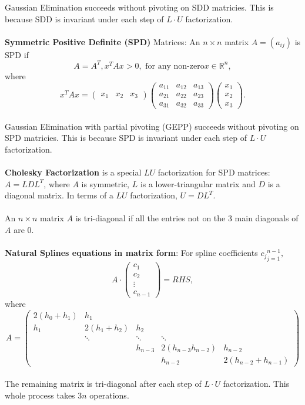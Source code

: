\documentclass{article}
\begin{document}
Gaussian Elimination succeeds without pivoting on SDD matricies. This is because SDD is invariant under each step of $L \cdot U$ factorization. \\ \\
\textbf{Symmetric Positive Definite (SPD)} Matrices: An $n \times n$ matrix $A = (a_{ij})$ is SPD if $$A = A^T, x^T Ax > 0, \text{ for any non-zero} x \in \mathbb{R}^n,$$ where $$x^T Ax = \begin{pmatrix}
    x_1 & x_2 & x_3
\end{pmatrix} \begin{pmatrix}
    a_{11} & a_{12} & a_{13} \\
    a_{21} & a_{22} & a_{23} \\
    a_{31} & a_{32} & a_{33}
\end{pmatrix} \begin{pmatrix}
    x_1 \\
    x_2 \\
    x_3
\end{pmatrix}.$$ \\
Gaussian Elimination with partial pivoting (GEPP) succeeds without pivoting on SPD matricies. This is because SPD is invariant under each step of $L \cdot U$ factorization. \\ \\
\textbf{Cholesky Factorization} is a special $LU$ factorization for SPD matrices: $A = LDL^T$, where $A$ is symmetric, $L$ is a lower-triangular matrix and $D$ is a diagonal matrix. In terms of a $LU$ factorization, $U = DL^T$. \\ \\
An $n \times n$ matrix $A$ is tri-diagonal if all the entries not on the 3 main diagonals of $A$ are 0. \\ \\
\textbf{Natural Splines equations in matrix form}: For spline coefficients ${c_j}_{j = 1}^{n - 1},$ $$A \cdot \begin{pmatrix}
    c_1 \\
    c_2 \\ 
    \vdots \\
    c_{n - 1}
\end{pmatrix} = RHS,$$ where $$A = \begin{pmatrix}
    2(h_0 + h_1) & h_1 \\
    h_1 & 2(h_1 + h_2) & h_2 \\
    & \ddots & \ddots & \ddots \\
    & & h_{n - 3} & 2(h_{n - 3} h_{n - 2}) & h_{n - 2} \\
    & & & h_{n - 2} & 2(h_{n - 2} + h_{n - 1})
\end{pmatrix}$$ \\
The remaining matrix is tri-diagonal after each step of $L \cdot U$ factorization. This whole process takes $3n$ operations. \\ \\
\end{document}

